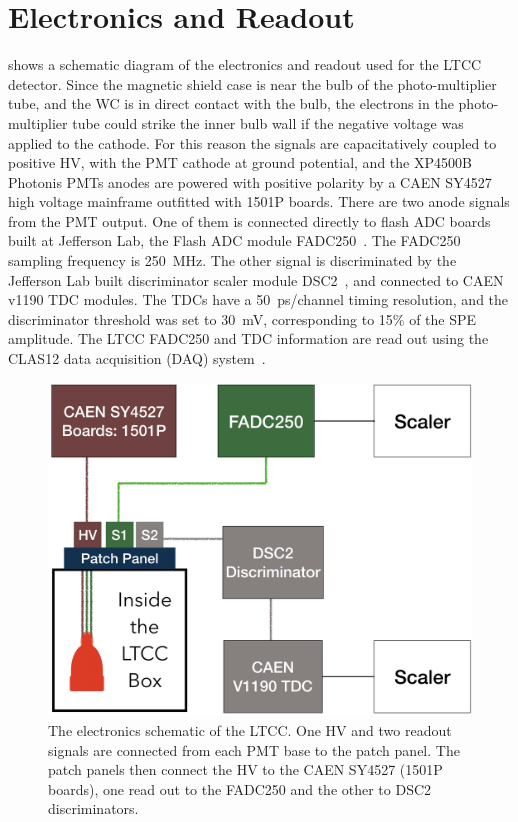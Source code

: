 \section{Electronics and Readout}

 shows a schematic diagram of the electronics and readout used for the LTCC
detector. Since the magnetic shield case is near the bulb of the photo-multiplier tube, and the WC is in direct contact
with the bulb, the electrons in the photo-multiplier tube could strike the inner bulb wall if the negative voltage
was applied to the cathode. For this reason the signals are capacitatively coupled to positive HV, with the PMT
cathode at ground potential,
and the XP4500B Photonis PMTs anodes are powered with positive polarity by a CAEN SY4527 high voltage
mainframe outfitted with 1501P boards. There are two anode signals from the PMT output. One of them is
connected directly to flash ADC boards built at Jefferson Lab, the Flash ADC module FADC250~\cite{daq-nim}.
The FADC250 sampling frequency is 250~MHz. The other signal is discriminated by the Jefferson Lab built
discriminator scaler module DSC2~\cite{daq-nim}, and connected to CAEN v1190 TDC modules. The TDCs have a
50~ps/channel timing resolution, and the discriminator threshold was set to 30~mV, corresponding to 15\% of the
SPE amplitude. The LTCC FADC250 and TDC information are read out using the CLAS12 data acquisition (DAQ)
system~\cite{daq-nim}.

\begin{figure}
	\centering
	\includegraphics[width=0.99\columnwidth, height=0.6\columnwidth]{img/electronicScheme.png}
	\caption{The electronics schematic of the LTCC. One HV and two readout signals are connected from each PMT
          base to the patch panel. The patch panels then connect the HV to the CAEN SY4527 (1501P boards), one read
          out to the FADC250 and the other to DSC2 discriminators.}
	\label{fig:electronicScheme}
\end{figure}

